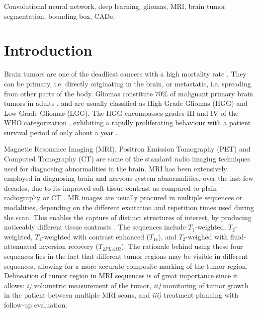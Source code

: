 \documentclass[journal,twocolumn]{IEEEtran}
\begin{document}
\begin{IEEEkeywords}
	\noindent Convolutional neural network, deep learning, gliomas, MRI, brain tumor segmentation, bounding box, CADe.
\end{IEEEkeywords}


\section{Introduction}

Brain tumors are one of the deadliest cancers with a high mortality rate \cite{DeAngelis2001, Bauer2013}. They can be primary, i.e. directly originating in the brain, or metastatic, i.e. spreading from other parts of the body. Gliomas constitute 70\% of malignant primary brain tumors in adults \cite{Bauer2013}, and are usually classified as High Grade Gliomas (HGG) and Low Grade Gliomas (LGG). The HGG encompasses grades III and IV of the WHO categorization \cite{Louis2007_WHO},  exhibiting a rapidly proliferating behaviour with a patient survival period of only about a year \cite{Bauer2013}.

Magnetic Resonance Imaging (MRI), Positron Emission Tomography (PET) and Computed Tomography (CT) are some of the standard radio imaging techniques used for diagnosing abnormalities in the brain.  MRI has been extensively employed in diagnosing brain and  nervous system abnormalities, over the last few decades, due to its improved soft tissue contrast as compared to plain radiography or CT \cite{Edelman1993_MRI,mitra2014integrating,mitra2015medical}. MR images are usually procured in multiple sequences or modalities, depending on the different excitation and repetition times used during the scan. This enables the  capture of  distinct structures of interest, by producing noticeably different tissue contrasts \cite{Bauer2013,banerjee2016novel}.
The sequences include $T_1$-weighted, $T_2$-weighted, $T_1$-weighted with contrast enhanced ($T_{1c}$), and $T_2$-weighed with fluid-attenuated inversion recovery ($T_{2FLAIR}$). The rationale behind using these four sequences lies in the fact that different tumor regions may be visible in different sequences, allowing for a more accurate composite marking of the  tumor region. Delineation of tumor region in MRI sequences is of great importance since it allows: \textit{i)} volumetric measurement of the tumor, \textit{ii)} monitoring of tumor growth in the patient between multiple MRI scans, and \textit{iii)} treatment planning with follow-up evaluation.
\end{document}
